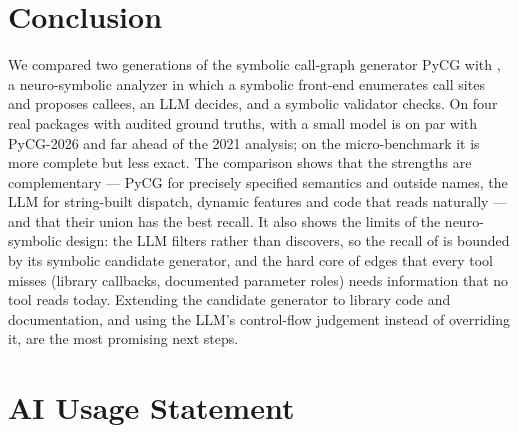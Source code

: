 \section{Conclusion}
\label{sec:conclusion}

We compared two generations of the symbolic call-graph generator PyCG with
\nscg, a neuro-symbolic analyzer in which a symbolic front-end enumerates call
sites and proposes callees, an LLM decides, and a symbolic validator checks. On
four real packages with audited ground truths, \nscg with a small model is on
par with PyCG-2026 and far ahead of the 2021 analysis; on the micro-benchmark it
is more complete but less exact. The comparison shows that the strengths are
complementary --- PyCG for precisely specified semantics and outside names,
the LLM for string-built dispatch, dynamic features and code that reads
naturally --- and that their union has the best recall. It also shows the
limits of the neuro-symbolic design: the LLM filters rather than discovers, so
the recall of \nscg is bounded by its symbolic candidate generator, and the
hard core of edges that every tool misses (library callbacks, documented
parameter roles) needs information that no tool reads today. Extending the
candidate generator to library code and documentation, and using the LLM's
control-flow judgement instead of overriding it, are the most promising next
steps.

\section*{AI Usage Statement}


